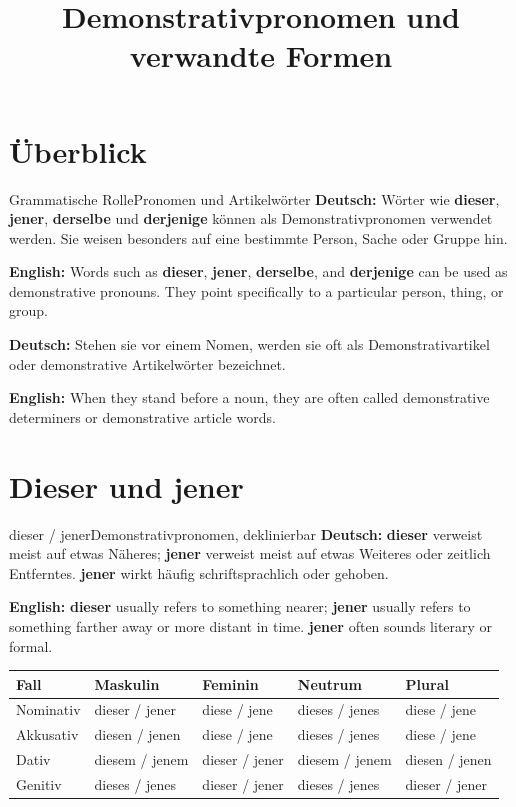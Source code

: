 \documentclass[a4paper,11pt]{article}
\title{Demonstrativpronomen und verwandte Formen}
\date{}
\newcommand{\GermanText}[1]{\textbf{Deutsch: }#1\par}
\newcommand{\EnglishText}[1]{{\small\color{SoftGray}\textbf{English: }#1\par}}
\newcommand{\HeaderRow}{\rowcolor{HeaderBlueDark}\color{white}\bfseries Fall & \color{white}\bfseries Maskulin & \color{white}\bfseries Feminin & \color{white}\bfseries Neutrum & \color{white}\bfseries Plural \\}
\begin{document}
\maketitle
\tableofcontents
\newpage

\section{Überblick}
\begin{grammarentry}{Grammatische Rolle}{Pronomen und Artikelwörter}
\GermanText{Wörter wie \textbf{dieser}, \textbf{jener}, \textbf{derselbe} und \textbf{derjenige} können als Demonstrativpronomen verwendet werden. Sie weisen besonders auf eine bestimmte Person, Sache oder Gruppe hin.}
\EnglishText{Words such as \textbf{dieser}, \textbf{jener}, \textbf{derselbe}, and \textbf{derjenige} can be used as demonstrative pronouns. They point specifically to a particular person, thing, or group.}
\GermanText{Stehen sie vor einem Nomen, werden sie oft als Demonstrativartikel oder demonstrative Artikelwörter bezeichnet.}
\EnglishText{When they stand before a noun, they are often called demonstrative determiners or demonstrative article words.}
\end{grammarentry}

\section{Dieser und jener}
\begin{grammarentry}{dieser / jener}{Demonstrativpronomen, deklinierbar}
\GermanText{\textbf{dieser} verweist meist auf etwas Näheres; \textbf{jener} verweist meist auf etwas Weiteres oder zeitlich Entferntes. \textbf{jener} wirkt häufig schriftsprachlich oder gehoben.}
\EnglishText{\textbf{dieser} usually refers to something nearer; \textbf{jener} usually refers to something farther away or more distant in time. \textbf{jener} often sounds literary or formal.}
\end{grammarentry}

\begin{center}
\begin{tabular}{|>{\centering\arraybackslash}m{2.2cm}|>{\centering\arraybackslash}m{2.5cm}|>{\centering\arraybackslash}m{2.5cm}|>{\centering\arraybackslash}m{2.5cm}|>{\centering\arraybackslash}m{2.5cm}|}
\hline
\HeaderRow
\hline
\rowcolor{RowBlueLight}Nominativ & dieser / jener & diese / jene & dieses / jenes & diese / jene \\
\hline
\rowcolor{RowBlueDark}Akkusativ & diesen / jenen & diese / jene & dieses / jenes & diese / jene \\
\hline
\rowcolor{RowBlueLight}Dativ & diesem / jenem & dieser / jener & diesem / jenem & diesen / jenen \\
\hline
\rowcolor{RowBlueDark}Genitiv & dieses / jenes & dieser / jener & dieses / jenes & dieser / jener \\
\hline
\end{tabular}
\end{center}
\end{document}
